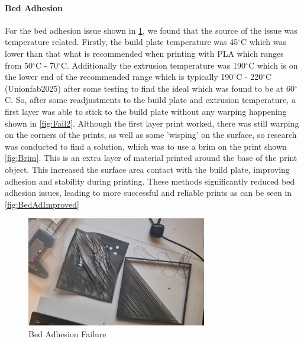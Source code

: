 \paragraph{Bed Adhesion}

For the bed adhesion issue shown in \ref{fig:Fail1}, we found that the source of the issue was temperature related. 
Firstly, the build plate temperature was 45$^{\circ}$C which was lower than that what is recommended when printing with PLA which ranges from 50$^{\circ}$C - 70$^{\circ}$C. 
Additionally the extrusion temperature was 190$^{\circ}$C which is on the lower end of the recommended range which is typically 190$^{\circ}$C - 220$^{\circ}$C (Unionfab2025) after some testing to find the ideal which was found to be at 60$^{\circ}$C.
So, after some readjustments to the build plate and extrusion temperature, a first layer was able to stick to the build plate without any warping happening shown in \ref{fig:Fail2}.
Although the first layer print worked, there was still warping on the corners of the prints, as well as some 'wisping' on the surface, so research was conducted to find a solution, which was to use a brim on the print shown \ref{fig:Brim}.
This is an extra layer of material printed around the base of the print object. 
This increased the surface area contact with the build plate, improving adhesion and stability during printing. 
These methods significantly reduced bed adhesion issues, leading to more successful and reliable prints as can be seen in \ref{fig:BedAdImproved}

\begin{figure}[htbp]
    \centering
    \includegraphics[width=0.7\textwidth]{figures/CAD-3DPrint/FAIL1.jpg}
    \caption{Bed Adhesion Failure}
    \label{fig:Fail1}
   
    
\end{figure}

